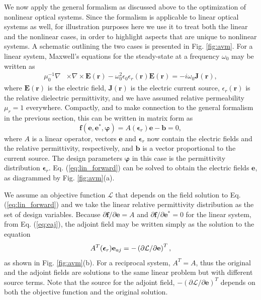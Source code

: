 We now apply the general formalism as discussed above to the  optimization of nonlinear optical systems. Since the formalism is applicable to linear optical systems as well, for illustration purposes here we use it to treat both the linear and the nonlinear cases, in order to highlight aspects that are unique to nonlinear systems.   A schematic outlining the two cases is presented in Fig. \ref{fig:avm}.  For a linear system, Maxwell's equations for the steady-state at a frequency $\omega_0$ may be written as 
%
\begin{align}
\mu_0^{-1}  \nabla &\times \nabla \times \mathbf{E}(\mathbf{r}) - \omega_0^2 \epsilon_0 \epsilon_r(\mathbf{r}) \mathbf{E}(\mathbf{r})  = -i \omega_0 \mathbf{J}(\mathbf{r}),
\label{eq:fdfd_lin}
\end{align}
where $\mathbf{E}(\mathbf{r})$ is the electric field, $\mathbf{J}(\mathbf{r})$ is the electric current source, $\epsilon_r(\mathbf{r})$ is the relative dielectric permittivity, and we have assumed relative permeability $\mu_r = 1$ everywhere. Compactly, and to make connection to the general formalism in the previous section, this can be written in matrix form as
%
\begin{equation}
\mathbf{f}(\mathbf{e}, \mathbf{e}^*, \bm{\varphi}) = A(\bm{\epsilon}_r) \mathbf{e} - \mathbf{b} = 0,
\label{eq:lin_forward}
\end{equation}
%
where $A$ is a linear operator, vectors $\mathbf{e}$ and $\bm{\epsilon}_r$ now contain the electric fields and the relative permittivity, respectively, and $\mathbf{b}$ is a vector proportional to the current source. The design parameters $\bm{\varphi}$ in this case is the permittivity distribution $\bm{\epsilon}_r$. Eq. (\ref{eq:lin_forward}) can be solved to obtain the electric fields $\mathbf{e}$, as diagrammed by Fig. \ref{fig:avm}(a).

We assume an objective function $\mathcal{L}$ that depends on the field solution to Eq. (\ref{eq:lin_forward}) and we take the linear relative permittivity distribution as the set of design variables.  Because $\partial \mathbf{f} / \partial \mathbf{e} = A$ and $\partial \mathbf{f} / \partial \mathbf{e}^* = 0$ for the linear system, from Eq. (\ref{eq:eaj}), the adjoint field may be written simply as the solution to the equation
%
\begin{equation}
A^T(\bm{\epsilon}_r) \mathbf{e}_{aj} = -\left( \partial \mathcal{L}/\partial \mathbf{e}\right)^T,
\end{equation}
%
as shown in Fig. \ref{fig:avm}(b).  For a reciprocal system, $A^T = A$, thus the original and the adjoint fields are solutions to the same linear problem but with different source terms. Note that the source for the adjoint field, $-\left( \partial \mathcal{L}/\partial \mathbf{e}\right)^T$ depends on both the objective function and the original solution. 

